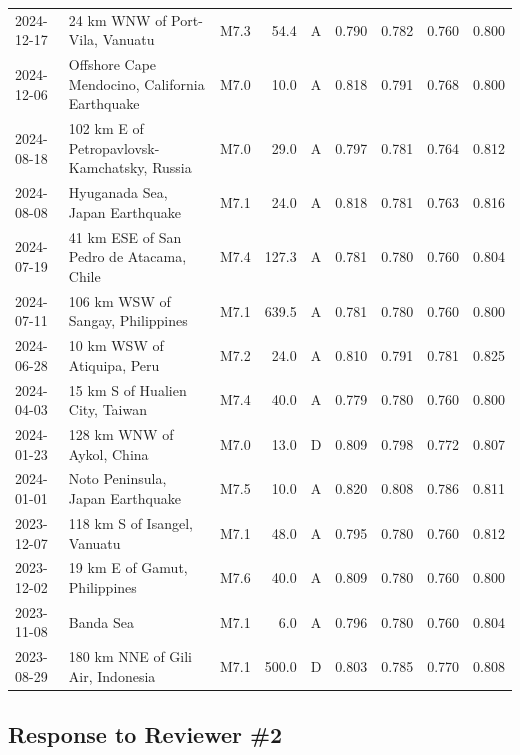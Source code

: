 \documentclass[12pt]{article}
\begin{document}
{\begin{table}[H]
{\begin{tabular}{@{}lllrcrrrr@{}}
2024-12-17 & 24 km WNW of Port-Vila, Vanuatu                      & M7.3 & 54.4  & A & 0.790 & 0.782 & 0.760 & 0.800 \\
2024-12-06 & Offshore Cape Mendocino, California Earthquake       & M7.0 & 10.0  & A & 0.818 & 0.791 & 0.768 & 0.800 \\
2024-08-18 & 102 km E of Petropavlovsk-Kamchatsky, Russia         & M7.0 & 29.0  & A & 0.797 & 0.781 & 0.764 & 0.812 \\
2024-08-08 & Hyuganada Sea, Japan Earthquake                      & M7.1 & 24.0  & A & 0.818 & 0.781 & 0.763 & 0.816 \\
2024-07-19 & 41 km ESE of San Pedro de Atacama, Chile             & M7.4 & 127.3 & A & 0.781 & 0.780 & 0.760 & 0.804 \\
2024-07-11 & 106 km WSW of Sangay, Philippines                    & M7.1 & 639.5 & A & 0.781 & 0.780 & 0.760 & 0.800 \\
2024-06-28 & 10 km WSW of Atiquipa, Peru                          & M7.2 & 24.0  & A & 0.810 & 0.791 & 0.781 & 0.825 \\
2024-04-03 & 15 km S of Hualien City, Taiwan                      & M7.4 & 40.0  & A & 0.779 & 0.780 & 0.760 & 0.800 \\
2024-01-23 & 128 km WNW of Aykol, China                           & M7.0 & 13.0  & D & 0.809 & 0.798 & 0.772 & 0.807 \\
2024-01-01 & Noto Peninsula, Japan Earthquake                     & M7.5 & 10.0  & A & 0.820 & 0.808 & 0.786 & 0.811 \\
2023-12-07 & 118 km S of Isangel, Vanuatu                         & M7.1 & 48.0  & A & 0.795 & 0.780 & 0.760 & 0.812 \\
2023-12-02 & 19 km E of Gamut, Philippines                        & M7.6 & 40.0  & A & 0.809 & 0.780 & 0.760 & 0.800 \\
2023-11-08 & Banda Sea                                            & M7.1 & 6.0   & A & 0.796 & 0.780 & 0.760 & 0.804 \\
2023-08-29 & 180 km NNE of Gili Air, Indonesia                    & M7.1 & 500.0 & D & 0.803 & 0.785 & 0.770 & 0.808 \\
\bottomrule
\end{tabular}%
}
\end{table}
}

\bigskip

\subsection*{Response to Reviewer \#2}
\end{document}
